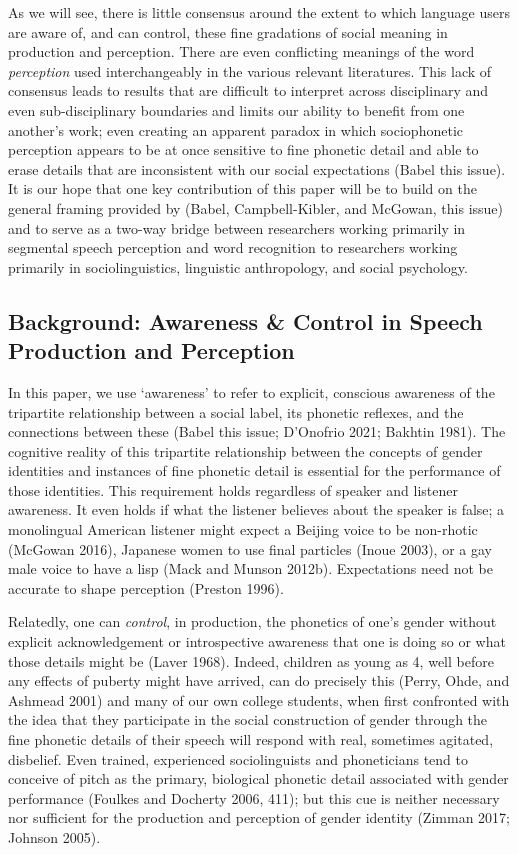 \documentclass[
  letterpaper,
  DIV=11,
  numbers=noendperiod]{scrartcl}
\begin{document}
As we will see, there is little consensus around the extent to which
language users are aware of, and can control, these fine gradations of
social meaning in production and perception. There are even conflicting
meanings of the word \emph{perception} used interchangeably in the
various relevant literatures. This lack of consensus leads to results
that are difficult to interpret across disciplinary and even
sub-disciplinary boundaries and limits our ability to benefit from one
another's work; even creating an apparent paradox in which sociophonetic
perception appears to be at once sensitive to fine phonetic detail and
able to erase details that are inconsistent with our social expectations
(Babel this issue). It is our hope that one key contribution of this
paper will be to build on the general framing provided by (Babel,
Campbell-Kibler, and McGowan, this issue) and to serve as a two-way
bridge between researchers working primarily in segmental speech
perception and word recognition to researchers working primarily in
sociolinguistics, linguistic anthropology, and social psychology.

\subsection{Background: Awareness \& Control in Speech Production and
Perception}\label{sec-background}

In this paper, we use `awareness' to refer to explicit, conscious
awareness of the tripartite relationship between a social label, its
phonetic reflexes, and the connections between these (Babel this issue;
D'Onofrio 2021; Bakhtin 1981). The cognitive reality of this tripartite
relationship between the concepts of gender identities and instances of
fine phonetic detail is essential for the performance of those
identities. This requirement holds regardless of speaker and listener
awareness. It even holds if what the listener believes about the speaker
is false; a monolingual American listener might expect a Beijing voice
to be non-rhotic (McGowan 2016), Japanese women to use final particles
(Inoue 2003), or a gay male voice to have a lisp (Mack and Munson
2012b). Expectations need not be accurate to shape perception (Preston
1996).

Relatedly, one can \emph{control}, in production, the phonetics of one's
gender without explicit acknowledgement or introspective awareness that
one is doing so or what those details might be (Laver 1968). Indeed,
children as young as 4, well before any effects of puberty might have
arrived, can do precisely this (Perry, Ohde, and Ashmead 2001) and many
of our own college students, when first confronted with the idea that
they participate in the social construction of gender through the fine
phonetic details of their speech will respond with real, sometimes
agitated, disbelief. Even trained, experienced sociolinguists and
phoneticians tend to conceive of pitch as the primary, biological
phonetic detail associated with gender performance (Foulkes and Docherty
2006, 411); but this cue is neither necessary nor sufficient for the
production and perception of gender identity (Zimman 2017; Johnson
2005).
\end{document}
